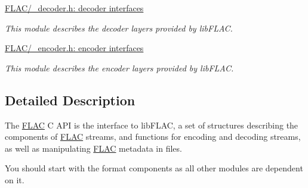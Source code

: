 \begin{DoxyCompactItemize}
\hyperlink{group__flac__decoder}{F\+L\+A\+C/\+\_\+decoder.\+h\+: decoder interfaces}
\begin{DoxyCompactList}\small\item\em This module describes the decoder layers provided by lib\+F\+L\+AC. \end{DoxyCompactList}\item 
\hyperlink{group__flac__encoder}{F\+L\+A\+C/\+\_\+encoder.\+h\+: encoder interfaces}
\begin{DoxyCompactList}\small\item\em This module describes the encoder layers provided by lib\+F\+L\+AC. \end{DoxyCompactList}\end{DoxyCompactItemize}


\subsection{Detailed Description}
The \hyperlink{namespace_f_l_a_c}{F\+L\+AC} C A\+PI is the interface to lib\+F\+L\+AC, a set of structures describing the components of \hyperlink{namespace_f_l_a_c}{F\+L\+AC} streams, and functions for encoding and decoding streams, as well as manipulating \hyperlink{namespace_f_l_a_c}{F\+L\+AC} metadata in files.

You should start with the format components as all other modules are dependent on it. 